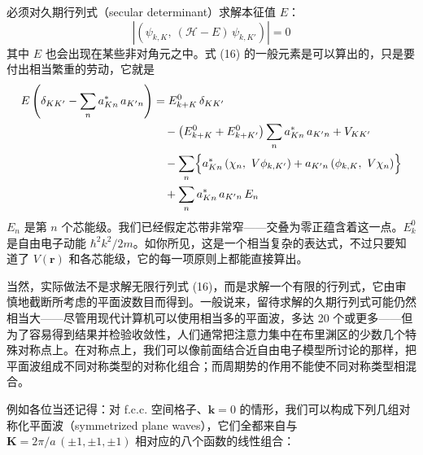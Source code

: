 必须对久期行列式（secular determinant）求解本征值 $E$：
\begin{equation*}
\left|\left(\psi_{k,K},\ (\mathcal{H}-E)\,\psi_{k,K'}\right)\right|=0\tag{16}
\end{equation*}
其中 $E$ 也会出现在某些非对角元之中。式 (16) 的一般元素是可以算出的，只是要付出相当繁重的劳动，它就是
\begin{align*}
E\left(\delta_{KK'}-\sum_n a_{Kn}^{*}\,a_{K'n}\right)&=E_{k+K}^{0}\,\delta_{KK'}\\
&\quad-\left(E_{k+K}^{0}+E_{k+K'}^{0}\right)\sum_n a_{Kn}^{*}\,a_{K'n}+V_{KK'}\\
&\quad-\sum_n\Bigl\{a_{Kn}^{*}\left(\chi_n,\ V\phi_{k,K'}\right)+a_{K'n}\left(\phi_{k,K},\ V\chi_n\right)\Bigr\}\\
&\quad+\sum_n a_{Kn}^{*}\,a_{K'n}\,E_n
\end{align*}
$E_n$ 是第 $n$ 个芯能级。我们已经假定芯带非常窄——交叠为零正蕴含着这一点。$E_k^0$ 是自由电子动能 $\hbar^2k^2/2m$。如你所见，这是一个相当复杂的表达式，不过只要知道了 $V(\mathbf{r})$ 和各芯能级，它的每一项原则上都能直接算出。

当然，实际做法不是求解无限行列式 (16)，而是求解一个有限的行列式，它由审慎地截断所考虑的平面波数目而得到。一般说来，留待求解的久期行列式可能仍然相当大——尽管用现代计算机可以使用相当多的平面波，多达 20 个或更多——但为了容易得到结果并检验收敛性，人们通常把注意力集中在布里渊区的少数几个特殊对称点上。在对称点上，我们可以像前面结合近自由电子模型所讨论的那样，把平面波组成不同对称类型的对称化组合；而周期势的作用不能使不同对称类型相混合。

例如各位当还记得：对 f.c.c. 空间格子、$\mathbf{k}=0$ 的情形，我们可以构成下列几组对称化平面波（symmetrized plane waves），它们全都来自与 $\mathbf{K}=2\pi/a\,(\pm 1,\pm 1,\pm 1)$ 相对应的八个函数的线性组合：


